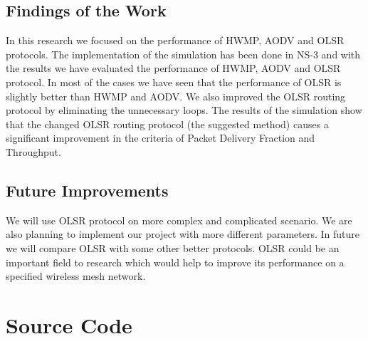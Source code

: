 \documentclass[12pt,a4paper]{report}
\begin{document}
\section{Findings of the Work}
In this research we focused on the performance of HWMP, AODV and OLSR protocols. The
implementation of the simulation has been done in NS-3 and with the results we have evaluated
the performance of  HWMP, AODV and OLSR protocol. In most of the cases we have seen that the
performance of OLSR is slightly better than HWMP and AODV. We also improved the OLSR routing
protocol by eliminating the unnecessary loops. The
results of the simulation show that the changed OLSR
routing protocol (the suggested method) causes a
significant improvement in the criteria of Packet Delivery Fraction and Throughput.
\section{Future Improvements}

We will use OLSR protocol on more complex and complicated scenario. We are also planning
to implement our project with more different parameters. In future we will compare OLSR with
some other better protocols. OLSR could be an important field to research which would help to
improve its performance on a specified wireless mesh network.


%
%


\appendices
\chapter{Source Code}

\end{document}
